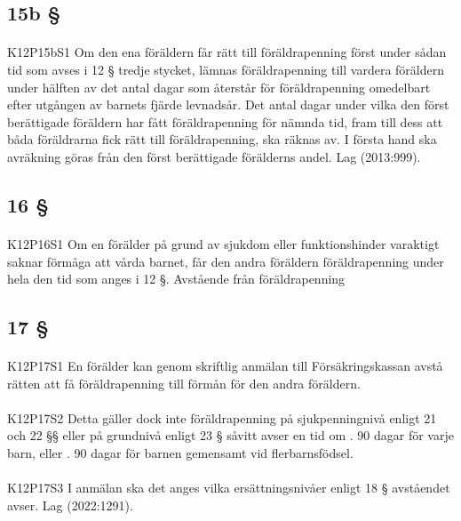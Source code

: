 \documentclass[a4paper,notitlepage,openany,10pt]{book}
\begin{document}
\subsection*{15b §}
\paragraph*{}
{\tiny K12P15bS1}
Om den ena föräldern får rätt till föräldrapenning först under sådan tid som avses i 12 § tredje stycket, lämnas föräldrapenning till vardera föräldern under hälften av det antal dagar som återstår för föräldrapenning omedelbart efter utgången av barnets fjärde levnadsår. Det antal dagar under vilka den först berättigade föräldern har fått föräldrapenning för nämnda tid, fram till dess att båda föräldrarna fick rätt till föräldrapenning, ska räknas av. I första hand ska avräkning göras från den först berättigade förälderns andel.
Lag (2013:999).
\subsection*{16 §}
\paragraph*{}
{\tiny K12P16S1}
Om en förälder på grund av sjukdom eller funktionshinder varaktigt saknar förmåga att vårda barnet, får den andra föräldern föräldrapenning under hela den tid som anges i 12 §.
Avstående från föräldrapenning
\subsection*{17 §}
\paragraph*{}
{\tiny K12P17S1}
En förälder kan genom skriftlig anmälan till Försäkringskassan avstå rätten att få föräldrapenning till förmån för den andra föräldern.
\paragraph*{}
{\tiny K12P17S2}
Detta gäller dock inte föräldrapenning på sjukpenningnivå enligt 21 och 22 §§ eller på grundnivå enligt 23 § såvitt avser en tid om
. 90 dagar för varje barn, eller
. 90 dagar för barnen gemensamt vid flerbarnsfödsel.
\paragraph*{}
{\tiny K12P17S3}
I anmälan ska det anges vilka ersättningsnivåer enligt 18 § avståendet avser.
Lag (2022:1291).
\end{document}
